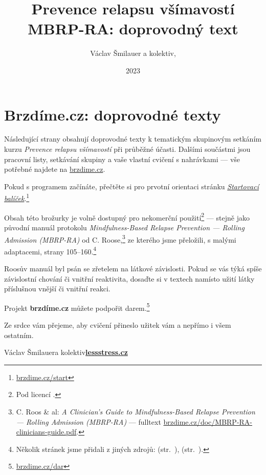 \documentclass[11pt,a5paper,twoside]{article}
\title{Prevence relapsu všímavostí MBRP-RA: doprovodný text}
\date{2023}
\author{Václav Šmilauer a kolektiv, \lessstressLogo}
\def\lessstressLogo{\href{https://lessstress.cz}{\textsf{\textbf{le\uline{\uline{\uline{s}s}s}tre\uline{\uline{s}s}.cz\uline{\hphantom{s}}}}}}
\begin{document}
	\thispagestyle{empty}
	\section*{Brzdíme.cz: doprovodné texty}

	\vskip-3mm
	Následující strany obsahují doprovodné texty k tematickým skupinovým setkáním kurzu \emph{Prevence relapsu všímavostí} při průběžné účasti. Dalšími součástmi jsou pracovní listy, setkávání skupiny a vaše vlastní cvičení s nahrávkami — vše potřebné najdete na \href{https://brzdime.cz}{brzdime.cz}.

	Pokud s programem začínáte, přečtěte si pro prvotní orientaci stránku \href{https://brzdime.cz/start}{\emph{Startovací balíček}}.\footnote{\href{https://brzdime.cz/start}{brzdime.cz/start}}

	Obsah této brožurky je volně dostupný pro nekomerční použití\footnote{Pod licencí \doclicenseNameRef.} — stejně jako původní manuál protokolu \emph{Mindfulness-Based Relapse Prevention — Rolling Admission (MBRP-RA)} od C. Roose,\footnote{C. Roos \& al: \emph{A Clinician's Guide to Mindfulness-Based Relapse Prevention — Rolling Admission (MBRP-RA)} — fulltext \href{https://brzdime.cz/doc/MBRP-RA-clinicians-guide.pdf}{brzdime.cz/doc/MBRP-RA-clinicians-guide.pdf}.} ze kterého jsme přeložili, s malými adaptacemi, strany 105–160.\footnote{Několik stránek jsme přidali z jiných zdrojů:
		 (str.~\pageref{slovni-zasoba-pocity}),
		 (str.~\pageref{slovni-zasoba-potreby}).
	}

	Roosův manuál byl psán se zřetelem na látkové závislosti. Pokud se vás týká spíše závislostní chování či vnitřní reaktivita, dosaďte si v textech namísto užití látky příslušnou vnější či vnitřní reakci.

	Projekt \textbf{brzdíme.cz} můžete podpořit darem.\footnote{\href{https://brzdime.cz/dar}{brzdime.cz/dar}}

	Ze srdce vám přejeme, aby cvičení přineslo užitek vám a nepřímo i všem ostatním.

	\hfill Václav Šmilauer\linebreak\null\hfill a kolektiv\linebreak\null\hfill\lessstressLogo

	\setlength{\cftbeforesecskip}{1ex}
	\clearpage
	\tableofcontents
	\thispagestyle{empty}

	
	
	
\end{document}
